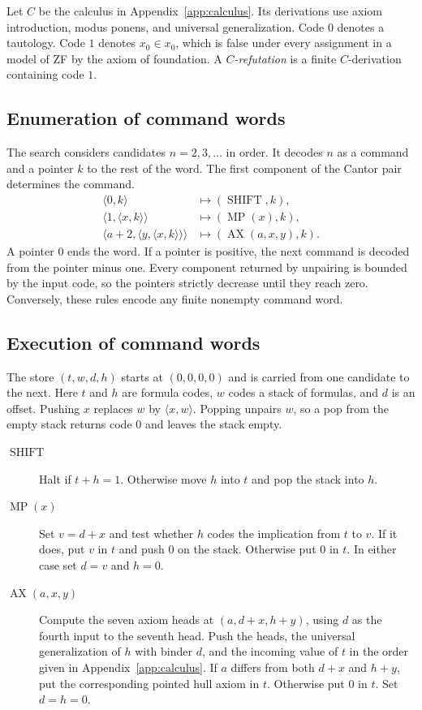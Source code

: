 \documentclass[11pt,letterpaper]{article}
\newcommand{\pair}[2]{\langle #1,#2\rangle}
\DeclareMathOperator{\AX}{AX}
\DeclareMathOperator{\MP}{MP}
\DeclareMathOperator{\SHIFT}{SHIFT}
\begin{document}
Let $C$ be the calculus in Appendix~\ref{app:calculus}.
Its derivations use axiom introduction, modus ponens, and universal
generalization. Code $0$ denotes a tautology. Code $1$ denotes
$x_0\in x_0$, which is false under every assignment in a model of
ZF by the axiom of foundation. A \emph{$C$-refutation} is a finite
$C$-derivation containing code $1$.

\subsection{Enumeration of command words}

The search considers candidates $n=2,3,\ldots$ in order. It decodes
$n$ as a command and a pointer $k$ to the rest of the word. The
first component of the Cantor pair determines the command.
\begin{align*}
  \pair{0}{k} &\longmapsto (\SHIFT,k),\\
  \pair{1}{\pair{x}{k}} &\longmapsto (\MP(x),k),\\
  \pair{a+2}{\pair{y}{\pair{x}{k}}} &\longmapsto (\AX(a,x,y),k).
\end{align*}
A pointer $0$ ends the word. If a pointer is positive, the next
command is decoded from the pointer minus one. Every component
returned by unpairing is bounded by the input code, so the pointers
strictly decrease until they reach zero. Conversely, these rules
encode any finite nonempty command word.

\subsection{Execution of command words}

The store $(t,w,d,h)$ starts at $(0,0,0,0)$ and is carried from
one candidate to the next. Here $t$ and $h$ are formula codes,
$w$ codes a stack of formulas, and $d$ is an offset. Pushing $x$
replaces $w$ by $\pair{x}{w}$. Popping unpairs $w$, so a pop
from the empty stack returns code $0$ and leaves the stack empty.

\begin{description}
\item[$\SHIFT$] Halt if $t+h=1$. Otherwise move $h$ into $t$ and pop the
stack into $h$.
\item[$\MP(x)$] Set $v=d+x$ and test whether $h$ codes the implication
from $t$ to $v$. If it does, put $v$ in $t$ and push $0$ on the
stack. Otherwise put $0$ in $t$. In either case set $d=v$ and $h=0$.
\item[$\AX(a,x,y)$] Compute the seven axiom heads at $(a,d+x,h+y)$,
using $d$ as the fourth input to the seventh head. Push the heads,
the universal generalization of $h$ with binder $d$, and the incoming
value of $t$ in the order given in Appendix~\ref{app:calculus}.
If $a$ differs from both $d+x$ and $h+y$, put the corresponding pointed
hull axiom in $t$. Otherwise put $0$ in $t$. Set $d=h=0$.
\end{description}
\end{document}
